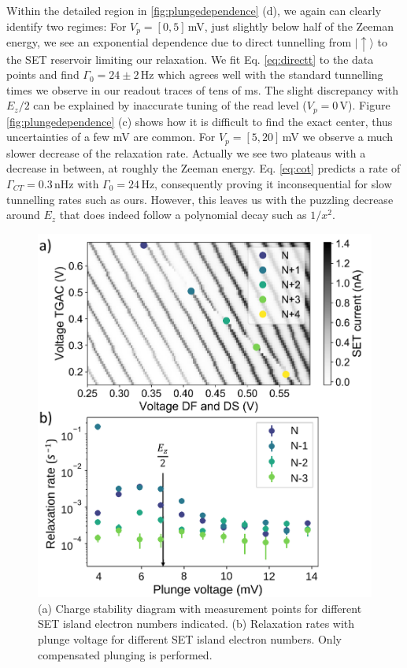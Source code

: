 \documentclass[%
 reprint,
 amsmath,amssymb,
 aps,
]{revtex4-1}
\newcommand {\ket} [1] {|{ #1 \rangle}}
\begin{document}
Within the detailed region in \ref{fig:plungedependence} (d), we again can clearly identify two regimes: For $V_p=[0,5]\,$mV, just slightly below half of the Zeeman energy, we see an exponential dependence due to direct tunnelling from $\ket{\uparrow}$ to the SET reservoir limiting our relaxation. We fit Eq. \eqref{eq:directt} to the data points and find $\Gamma_0=24\pm2\,$Hz which agrees well with the standard tunnelling times we observe in our readout traces of tens of ms. The slight discrepancy with $E_z/2$ can be explained by inaccurate tuning of the read level ($V_p=0\,$V). Figure \ref{fig:plungedependence} (c) shows how it is difficult to find the exact center, thus uncertainties of a few mV are common. For $V_p=[5,20]\,$mV we observe a much slower decrease of the relaxation rate. Actually we see two plateaus with a decrease in between, at roughly the Zeeman energy. Eq. \ref{eq:cot} predicts a rate of $\Gamma_{CT}=0.3\,$nHz with $\Gamma_0=24\,$Hz, consequently proving it inconsequential for slow tunnelling rates such as ours. However, this leaves us with the puzzling decrease around $E_z$ that does indeed follow a polynomial decay such as $1/x^2$. 

\begin{figure}
\centering
\includegraphics[width=0.8\columnwidth]{figures/fig6.pdf}
\caption{
(a) Charge stability diagram with measurement points for different SET island electron numbers indicated. (b) Relaxation rates with plunge voltage for different SET island electron numbers. Only compensated plunging is performed. 
}
\label{fig:electronnumberdependence}
\end{figure}
\end{document}
